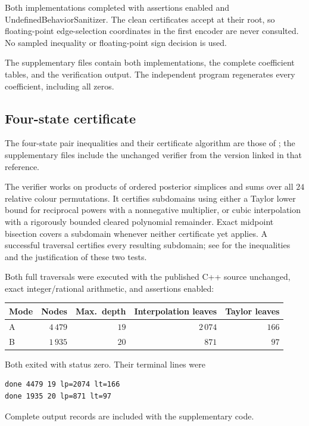 Both implementations completed with assertions enabled and
UndefinedBehaviorSanitizer.  The clean certificates accept at their root,
so floating-point edge-selection coordinates in the first encoder are
never consulted.  No sampled inequality or floating-point sign decision
is used.

The supplementary files contain both implementations, the complete coefficient tables, and the verification output. The independent program regenerates every coefficient, including all zeros.

\subsection{Four-state certificate}

The four-state pair inequalities and their certificate algorithm are those of \cite{OpenAI4}; the supplementary files include the unchanged verifier from the version linked in that reference.

The verifier works on products of ordered posterior simplices and sums
over all \(24\) relative colour permutations.  It certifies subdomains
using either a Taylor lower bound for reciprocal powers with a
nonnegative multiplier, or cubic interpolation with a rigorously bounded
cleared polynomial remainder.  Exact midpoint bisection covers a
subdomain whenever neither certificate yet applies.  A successful
traversal certifies every resulting subdomain; see \cite{OpenAI4} for the
inequalities and the justification of these two tests.

Both full traversals were executed with the published C++ source unchanged,
exact integer/rational arithmetic, and assertions enabled:
\begin{center}
\begin{tabular}{lrrrr}
\hline
Mode & Nodes & Max.\ depth & Interpolation leaves & Taylor leaves\\
\hline
A & \(4\,479\) & \(19\) & \(2\,074\) & \(166\)\\
B & \(1\,935\) & \(20\) & \(871\) & \(97\)\\
\hline
\end{tabular}
\end{center}
Both exited with status zero.  Their terminal lines were
\begin{verbatim}
done 4479 19 lp=2074 lt=166
done 1935 20 lp=871 lt=97
\end{verbatim}
Complete output records are included with the supplementary code.

